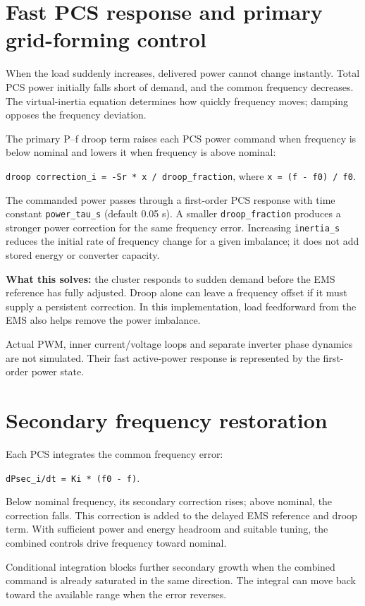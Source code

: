\documentclass[11pt,a4paper]{article}
\begin{document}
\section{Fast PCS response and primary grid-forming control}

When the load suddenly increases, delivered power cannot change instantly. Total PCS power initially falls short of demand, and the common frequency decreases. The virtual-inertia equation determines how quickly frequency moves; damping opposes the frequency deviation.

The primary P--f droop term raises each PCS power command when frequency is below nominal and lowers it when frequency is above nominal:

\texttt{droop correction\_i = -Sr  *  x / droop\_fraction}, where \texttt{x = (f - f0) / f0}.

The commanded power passes through a first-order PCS response with time constant \texttt{power\_tau\_s} (default 0.05 s). A smaller \texttt{droop\_fraction} produces a stronger power correction for the same frequency error. Increasing \texttt{inertia\_s} reduces the initial rate of frequency change for a given imbalance; it does not add stored energy or converter capacity.

\textbf{What this solves:} the cluster responds to sudden demand before the EMS reference has fully adjusted. Droop alone can leave a frequency offset if it must supply a persistent correction. In this implementation, load feedforward from the EMS also helps remove the power imbalance.

Actual PWM, inner current/voltage loops and separate inverter phase dynamics are not simulated. Their fast active-power response is represented by the first-order power state.

\section{Secondary frequency restoration}

Each PCS integrates the common frequency error:

\texttt{dPsec\_i/dt = Ki  *  (f0 - f)}.

Below nominal frequency, its secondary correction rises; above nominal, the correction falls. This correction is added to the delayed EMS reference and droop term. With sufficient power and energy headroom and suitable tuning, the combined controls drive frequency toward nominal.

Conditional integration blocks further secondary growth when the combined command is already saturated in the same direction. The integral can move back toward the available range when the error reverses.
\end{document}
